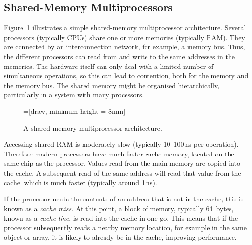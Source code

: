 
\subsection{Shared-Memory Multiprocessors}

Figure~\ref{fig:multi-arch} illustrates a simple shared-memory multiprocessor
architecture.  Several processors (typically CPUs) share one or more memories
(typically RAM).  They are connected by an interconnection network, for
example, a memory bus.  Thus, the different processors can read from and write
to the same addresses in the memories.  The hardware itself can only deal with
a limited number of simultaneous operations, so this can lead to contention,
both for the memory and the memory bus.  The shared memory might be organised
hierarchically, particularly in a system with many processors.


\begin{figure}
=[draw, minimum height = 8mm]
\begin{center}
\end{center}
\caption{A shared-memory multiprocessor architecture.}
\label{fig:multi-arch}
\end{figure}

Accessing shared RAM is moderately slow (typically 10--100\,ns per operation).
Therefore modern processors have much faster cache memory, located on the same
chip as the processor.  Values read from the main memory are copied into the
cache.  A subsequent read of the same address will read that value from the
cache, which is much faster (typically around 1\,ns).

If the processor needs the contents of an address that is not in the cache,
this is known as a \emph{cache miss}.  At this point, a block of memory,
typically 64~bytes, known as a \emph{cache line}, is read into the cache in
one go.  This means that if the processor subsequently reads a nearby memory
location, for example in the same object or array, it is likely to already be
in the cache, improving performance.
  
